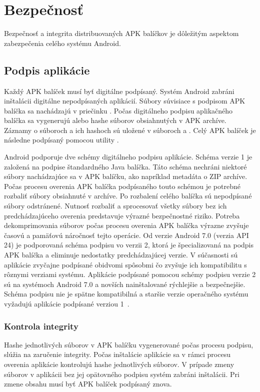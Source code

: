 \section{Bezpečnosť}

Bezpečnosť a integrita distribuovaných APK balíčkov je dôležitým aspektom zabezpečenia celého systému Android.

\subsection{Podpis aplikácie}

Každý APK balíček musí byť digitálne podpísaný. Systém Android zabráni inštalácii digitálne nepodpísaných aplikácií. 
Súbory súvisiace s podpisom APK balíčka sa nachádzajú v priečinku . Počas digitálneho podpisu aplikačného balíčka sa vygenerujú  alebo  hashe súborov obsiahnutých v APK archíve. Záznamy o súboroch a ich hashoch sú uložené v súboroch  a . Celý APK balíček je následne podpísaný pomocou utility . 

Android podporuje dve schémy digitálneho podpisu aplikácie. Schéma verzie 1 je založená na podpise štandardného Java balíčka. Táto schéma nechráni niektoré súbory nachádzajúce sa v APK balíčku, ako napríklad metadáta o ZIP archíve. Počas procesu overenia APK balíčka podpísaného touto schémou je potrebné rozbaliť súbory obsiahnuté v archíve. Po rozbalení celého balíčka sú nepodpísané súbory odstránené. Nutnosť rozbaliť a sprocesovať všetky súbory bez ich predchádzajúceho overenia predstavuje výrazné bezpečnostné riziko. Potreba dekomprimovania súborov počas procesu overenia APK balíčka výrazne zvyšuje časovú a pamäťovú náročnosť tejto operácie.  Od verzie Android 7.0 (verzia API 24) je podporovaná schéma podpisu vo verzii 2, ktorá je špecializovaná na podpis APK balíčka a eliminuje nedostatky predchádzajúcej verzie. V súčasnosti sú aplikácie zvyčajne podpísané obidvomi spôsobmi čo zvyšuje ich kompatibilitu s rôznymi verziami systému. Aplikácie podpísané pomocou schémy podpisu verzie 2 sú na systémoch Android 7.0 a novších nainštalované rýchlejšie a bezpečnejšie. Schéma podpisu nie je spätne kompatibilná a staršie verzie operačného systému vyžadujú aplikácie podpísané verziou 1~\cite{NT0FrzQIkOAYbG2Ga}.

\subsubsection{\textbf{Kontrola integrity}}
Hashe jednotlivých súborov v APK balíčku vygenerované počas procesu podpisu, slúžia na zaručenie integrity. Počas inštalácie aplikácie sa v rámci procesu overenia aplikácie kontrolujú hashe jednotlivých súborov. V prípade zmeny súborov v aplikácii bez jej opätovného podpisu systém zabráni inštalácii. Pri zmene obsahu musí byť APK balíček podpísaný znova. 


